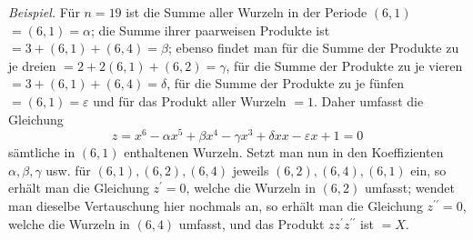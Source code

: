 \textit{Beispiel.} Für \(n=19\) ist die Summe aller Wurzeln in der Periode \((6,1)\) \(=(6,1)=\alpha\); die Summe ihrer paarweisen Produkte ist \(=3+(6,1)+(6,4)=\beta\); ebenso
findet man für die Summe der Produkte zu je dreien \(=2+2(6,1)+(6,2)=\gamma\), für die Summe der Produkte zu je vieren \(=3+(6,1)+(6,4)=\delta\), für die Summe der Produkte zu je fünfen \(=(6,1)=\varepsilon\) und für das Produkt aller Wurzeln \(=1\). Daher umfasst die Gleichung \[z=x^6-\alpha x^5+\beta x^4-\gamma x^3+\delta xx-\varepsilon x+1=0\] sämtliche in \((6,1)\) enthaltenen Wurzeln. Setzt man nun in den Koeffizienten \(\alpha,\allowbreak \beta,\allowbreak \gamma\) usw. für \((6,1),\allowbreak (6,2),\allowbreak (6,4)\) jeweils \((6,2),\allowbreak (6,4),\allowbreak (6,1)\) ein, so erhält man die Gleichung \(z^{\prime}=0\), welche die Wurzeln in \((6,2)\) umfasst; wendet man dieselbe Vertauschung hier nochmals an, so erhält man die Gleichung \(z^{\prime\prime}=0\), welche die Wurzeln in \((6,4)\) umfasst, und das Produkt \(zz^{\prime}z^{\prime\prime}\) ist \(=X\).


